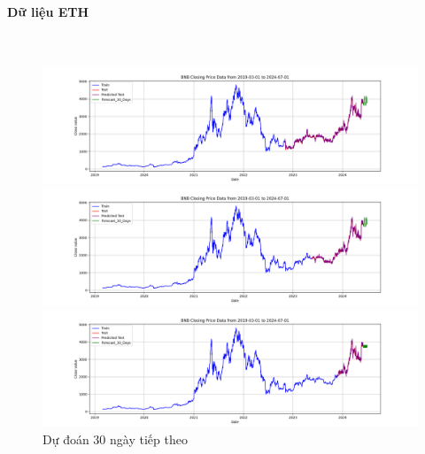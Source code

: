 \documentclass[conference]{IEEEtran}
\begin{document}
	\paragraph{\textbf{Dữ liệu ETH}} \mbox{} \\
	\begin{figure}[H]
		\centering
		\begin{minipage}{0.15\textwidth}
			\centering
			\includegraphics[width=1\textwidth]{Figure/RandomForest_ETH_30days_73.png}
		\end{minipage}
		\hfill
		\begin{minipage}{0.15\textwidth}
			\centering
			\includegraphics[width=1\textwidth]{Figure/RandomForest_ETH_30days_82.png}
		\end{minipage}
		\hfill
		\begin{minipage}{0.15\textwidth}
			\centering
			\includegraphics[width=1\textwidth]{Figure/RandomForest_ETH_30days_91.png}
		\end{minipage}
		\caption{Dự đoán 30 ngày tiếp theo}
		\label{fig:1}
	\end{figure}
	
\end{document}
